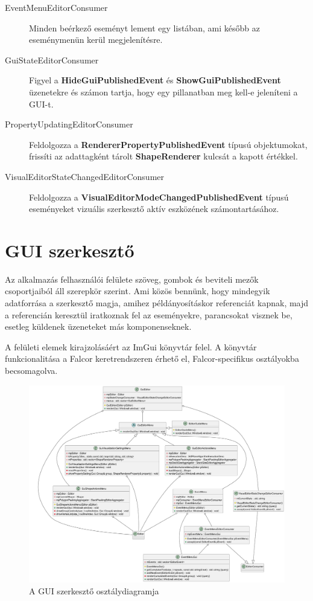 \begin{description}
	\item[EventMenuEditorConsumer] Minden beérkező eseményt lement egy listában, ami később az eseménymenün kerül megjelenítésre.
	\item[GuiStateEditorConsumer] Figyel a \textbf{HideGuiPublishedEvent} és \textbf{ShowGuiPublishedEvent} üzenetekre és számon tartja, hogy egy pillanatban meg kell-e jeleníteni a GUI-t.
	\item[PropertyUpdatingEditorConsumer] Feldolgozza a \textbf{RendererPropertyPublishedEvent} típusú objektumokat, frissíti az adattagként tárolt \textbf{ShapeRenderer} kulcsát a kapott értékkel.
	\item[VisualEditorStateChangedEditorConsumer] Feldolgozza a \textbf{VisualEditorModeChangedPublishedEvent} típusú eseményeket vizuális szerkesztő aktív eszközének számontartásához.
\end{description}


\section{GUI szerkesztő}

Az alkalmazás felhasználói felülete szöveg, gombok és beviteli mezők csoportjaiból áll szerepkör szerint. Ami közös bennünk, hogy mindegyik adatforrása a szerkesztő magja, amihez példányosításkor referenciát kapnak, majd a referencián keresztül iratkoznak fel az eseményekre, parancsokat visznek be, esetleg küldenek üzeneteket más komponenseknek.

A felületi elemek kirajzolásáért az ImGui könyvtár \cite{imgui} felel. A könyvtár funkcionalitása a Falcor keretrendszeren érhető el, Falcor-specifikus osztályokba becsomagolva.


\begin{figure}[H]
	\centering
	\includegraphics[width=1\linewidth]{images/class_gui_editor.png}
	\caption{A GUI szerkesztő osztálydiagramja}
	\label{fig:class_gui_editor-1}
\end{figure}

